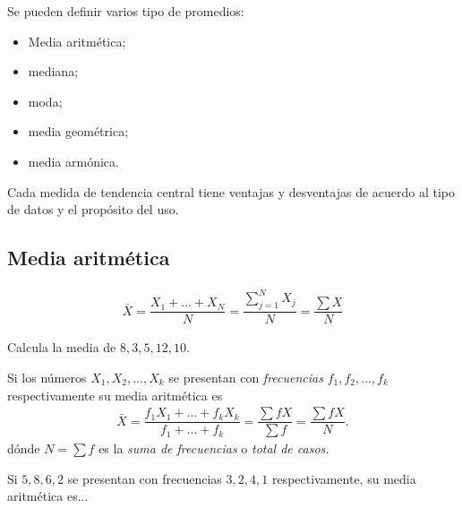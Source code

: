 Se pueden definir varios tipo de promedios: 
\begin{itemize}
	\item Media aritmética;
	\item mediana;
	\item moda;
	\item media geométrica;
	\item media armónica.
\end{itemize}



\begin{observacion}
	Cada medida de tendencia central tiene ventajas y desventajas de acuerdo al tipo de datos y el propósito del uso.
\end{observacion}


\subsection{Media aritmética}

\begin{definicion}
	\begin{align}
		\label{3.1}
		\bar{X} =\dfrac{X_{1}+...+X_{N}}{N} = \dfrac{\sum_{j=1}^{N}X_{j}}{N}=\dfrac{\sum X}{N}
	\end{align}
\end{definicion}



\begin{ejemplo}
	Calcula la media de $8,3,5,12,10$.
\end{ejemplo}




Si los números $X_{1},X_{2},...,X_{k}$ se presentan con \emph{frecuencias} $f_{1}, f_{2},...,f_{k}$ respectivamente su media aritmética es
\begin{align}
	\label{3.2}
	\bar{X}=\dfrac{f_{1}X_{1}+...+f_{k}X_{k}}{f_{1}+...+f_{k}}=\dfrac{\sum fX}{\sum f}=\dfrac{\sum fX}{N}.
\end{align}
dónde $N=\sum f$ es la \emph{suma de frecuencias} o \emph{total de casos.}


\begin{ejemplo}
	Si $5,8,6,2$ se presentan con frecuencias $3,2,4,1$ respectivamente, su media aritmética es...
\end{ejemplo}

 
